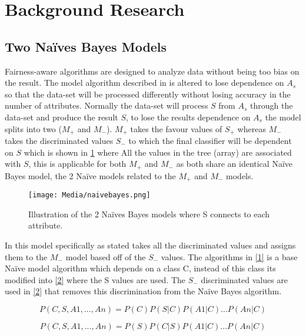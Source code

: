 \section{Background Research}
\label{Background Research Section}

\subsection{Two Naïves Bayes Models}
\label{Two Naïves Bayes Models Research Section}

Fairness-aware algorithms are designed to analyze data without being too bias on the result. The model algorithm described in \cite{Naive} is altered to lose dependence on $A_s$ so that the data-set will be processed differently without losing accuracy in the number of attributes. Normally the data-set will process $S$ from $A_s$ through the data-set and produce the result $S$, to lose the results dependence on $A_s$ the model splits into two ($M_+$ and $M_-$). $M_+$ takes the favour values of $S_+$ whereas $M_-$ takes the discriminated values $S_-$ to which the final classifier will be dependent on $S$ which is shown in \cref{NaiveBayesFig} where All the values in the tree (array) are associated with $S$, this is applicable for both $M_+$ and $M_-$ as both share an identical Naïve Bayes model, the 2 Naïve models related to the $M_+$ and $M_-$ models.

\begin{figure}[H]
    \centering
    \texttt{[image: Media/naivebayes.png]}
    \caption{Illustration of the 2 Naïves Bayes models where S connects to each attribute. \cite{Naive}}
    \label{NaiveBayesFig}
\end{figure}

In this model specifically as stated takes all the discriminated values and assigns them to the $M_-$ model based off of the $S_-$ values. The algorithms in \cref{1} is a base Naïve model algorithm which depends on a class C, instead of this class its modified into \cref{2} where the S values are used. The $S_-$ discriminated values are used in \cref{2} that removes this discrimination from the Naïve Bayes algorithm.

\begin{equation}
    P(C,S,A1,...,An) = P(C)P(S|C)P(A1|C)...P(An|C)
    \label{1}
\end{equation}

\begin{equation}
    P(C,S,A1,...,An) = P(S)P(C|S)P(A1|C)...P(An|C)
    \label{2}
\end{equation}

